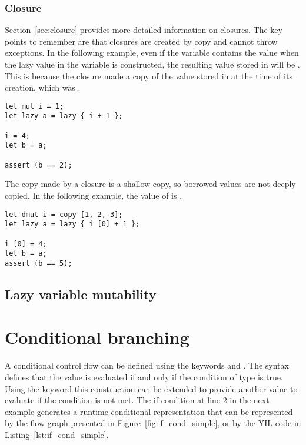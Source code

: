 \subsubsection*{Closure}

Section~\ref{sec:closure} provides more detailed information on closures. The
key points to remember are that closures are created by copy and cannot throw
exceptions. In the following example, even if the variable  contains
the value  when the lazy value in the variable  is
constructed, the resulting value stored in  will be . This is
because the closure made a copy of the value stored in  at the time of
its creation, which was .

\begin{lstlisting}[style=coloredverbatim]
let mut i = 1;
let lazy a = lazy { i + 1 };

i = 4;
let b = a;

assert (b == 2);
\end{lstlisting}

The copy made by a closure is a shallow copy, so borrowed values are not deeply
copied. In the following example, the value of  is .

\begin{lstlisting}[style=coloredverbatim]
let dmut i = copy [1, 2, 3];
let lazy a = lazy { i [0] + 1 };

i [0] = 4;
let b = a;
assert (b == 5);
\end{lstlisting}

\subsection{Lazy variable mutability}
\label{sec:lazy_mutability}




\section{Conditional branching}%
\label{sec:if_else}

A conditional control flow can be defined using the keywords  and
. The syntax  defines that the value  is
evaluated if and only if the condition  of type  is true.
Using the keyword  this construction can be extended to provide
another value to evaluate if the condition is not met. The if condition at line
2 in the next example generates a runtime conditional representation that can be
represented by the flow graph presented in Figure~\ref{fig:if_cond_simple}, or
by the YIL code in Listing~\ref{lst:if_cond_simple}.


